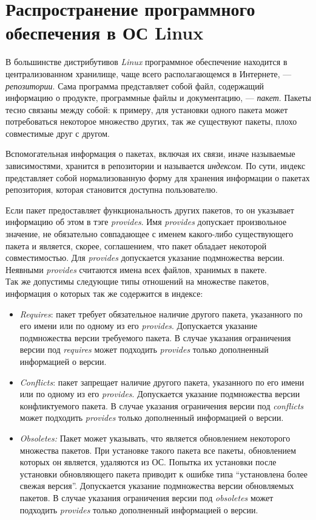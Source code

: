 \section{Распространение программного обеспечения в ОС Linux}

В большинстве дистрибутивов \textit{Linux} программное обеспечение находится
в централизованном хранилище, чаще всего располагающемся в Интернете, 
--- \textit{репозитории}. Сама программа представляет собой файл, содержащий
информацию о продукте, программные файлы и документацию, --- \textit{пакет}. 
Пакеты тесно связаны между собой: к примеру, для установки одного пакета
может потребоваться некоторое множество других, так же существуют пакеты, плохо
совместимые друг с другом. 

Вспомогательная информация о пакетах, включая их связи, иначе называемые зависимостями,
хранится в репозитории и называется \textit{индексом}.
По сути, индекс представляет собой нормализованную форму для хранения информации о пакетах 
репозитория, которая становится доступна пользователю.

Если пакет предоставляет 
функциональность других пакетов, то он указывает информацию об этом в тэге \textit{provides}.
Имя \textit{provides} допускает произвольное значение, не обязательно совпадающее с
именем какого-либо существующего  пакета и является, скорее, соглашением, что пакет
обладает некоторой совместимостью. Для \textit{provides} допускается указание подмножества 
версии. Неявными \textit{provides} считаются имена всех файлов, хранимых в пакете.\\

Так же допустимы следующие типы отношений на множестве пакетов, информация о которых так
же содержится в индексе\cite{deepsolver_ta}:
\begin{itemize}
\item{\textit{Requires}: пакет требует обязательное наличие другого пакета, указанного
по его имени или по одному из его \textit{provides}. Допускается указание 
подмножества версии требуемого пакета. В случае указания ограничения версии
под \textit{requires} может подходить \textit{provides} только дополненный информацией
о версии.}
\item{\textit{Conflicts}: пакет запрещает наличие другого пакета, указанного по его имени
 или по одному из его \textit{provides}. Допускается указание подмножества
версии конфликтуемого пакета. В случае указания ограничения версии
под \textit{conflicts} может подходить \textit{provides} только дополненный информацией
о версии.}
\item{\textit{Obsoletes:} Пакет может указывать, что является обновлением некоторого
множества пакетов. При установке такого пакета все пакеты, обновлением
которых он является, удаляются из ОС. Попытка их установки после
установки обновляющего пакета приводит к ошибке типа ``установлена
более свежая версия''. Допускается указание подмножества версии обновляемых
пакетов. В случае указания ограничения версии под \textit{obsoletes} может
подходить \textit{provides} только дополненный информацией о версии.}
\end{itemize}

